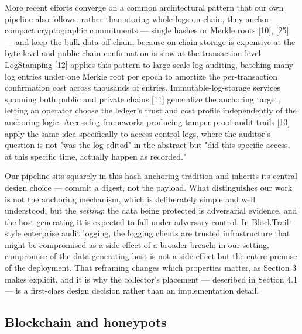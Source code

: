 \documentclass[journal]{IEEEtran}
\begin{document}
More recent efforts converge on a common architectural pattern that our own pipeline also follows: rather than storing whole logs on-chain, they anchor compact cryptographic commitments --- single hashes or Merkle roots [10], [25] --- and keep the bulk data off-chain, because on-chain storage is expensive at the byte level and public-chain confirmation is slow at the transaction level. LogStamping [12] applies this pattern to large-scale log auditing, batching many log entries under one Merkle root per epoch to amortize the per-transaction confirmation cost across thousands of entries. Immutable-log-storage services spanning both public and private chains [11] generalize the anchoring target, letting an operator choose the ledger's trust and cost profile independently of the anchoring logic. Access-log frameworks producing tamper-proof audit trails [13] apply the same idea specifically to access-control logs, where the auditor's question is not "was the log edited" in the abstract but "did this specific access, at this specific time, actually happen as recorded."

Our pipeline sits squarely in this hash-anchoring tradition and inherits its central design choice --- commit a digest, not the payload. What distinguishes our work is not the anchoring mechanism, which is deliberately simple and well understood, but the \emph{setting}: the data being protected is adversarial evidence, and the host generating it is expected to fall under adversary control. In BlockTrail-style enterprise audit logging, the logging clients are trusted infrastructure that might be compromised as a side effect of a broader breach; in our setting, compromise of the data-generating host is not a side effect but the entire premise of the deployment. That reframing changes which properties matter, as Section 3 makes explicit, and it is why the collector's placement --- described in Section 4.1 --- is a first-class design decision rather than an implementation detail.

\subsection{Blockchain and honeypots}
\end{document}
